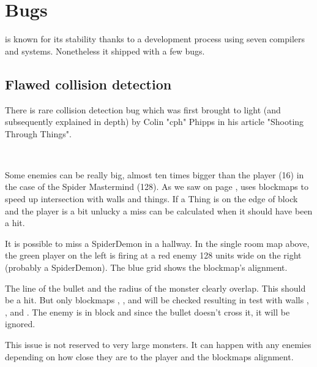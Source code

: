 \section{Bugs}
\doom{} is known for its stability thanks to a development process using seven compilers and systems. Nonetheless it shipped with a few bugs.








\subsection{Flawed collision detection}
There is rare collision detection bug which was first brought to light (and subsequently explained in depth) by Colin "cph" Phipps in his article "Shooting Through Things".\\
\par
{}\\
\par
Some enemies can be really big, almost ten times bigger than the player (16) in the case of the Spider Mastermind (128). As we saw on page \pageref{E1M1_blockmap}, \doom{} uses blockmaps to speed up intersection with walls and things. If a Thing is on the edge of block and the player is a bit unlucky a miss can be calculated when it should have been a hit.

\vspace{-1cm}


\par
It is possible to miss a SpiderDemon in a hallway. In the single room map above, the green player on the left is firing at a red enemy 128 units wide on the right (probably a SpiderDemon). The blue grid shows the blockmap's alignment.\\
\par
 The line of the bullet and the radius of the monster clearly overlap. This should be a hit. But only blockmaps , , and  will be checked resulting in test with walls , , and . The enemy is in block  and since the bullet doesn't cross it, it will be ignored.\\
 \par
 This issue is not reserved to very large monsters. It can happen with any enemies depending on how close they are to the player and the blockmaps alignment.







